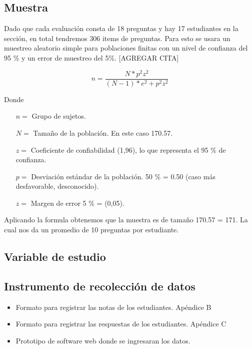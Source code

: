 \subsection{Muestra}

Dado que cada evaluación consta de 18 preguntas y hay 17 estudiantes en la sección, en total tendremos 306 items de preguntas. Para esto se usara un muestreo aleatorio simple para poblaciones finitas con un nivel de confianza del 95 \%  y un error de muestreo del 5\%. [AGREGAR CITA]

\[ n  = \frac{ N * p^{2} z^{2} } { (N - 1) * e^{2} + p^{2} z^{2} } \]

\vskip 0.1cm 
Donde
\vskip 0.1cm 

\begin{itemize}
	\item [$n =$] Grupo de sujetos.
	\item [$N =$] Tamaño de la población. En este caso 170.57.
	\item [$z =$] Coeficiente de confiabilidad (1,96), lo que representa el 95 \% de confianza.
	\item [$p =$] Desviación estándar de la población. 50 \% = 0.50 (caso más desfavorable, desconocido).
	\item [$z =$] Margen de error 5 \% = (0,05).
\end{itemize}

Aplicando la formula obtenemos que la muestra es de tamaño 170.57 = 171. La cual nos da un promedio de 10 preguntas por estudiante.


\subsection{Variable de estudio}




\subsection{Instrumento de recolección de datos}

\begin{itemize}
	\item Formato para registrar las notas de los estudiantes. Apéndice B
	\item Formato para registrar las respuestas de los estudiantes. Apéndice C
	\item Prototipo de software web donde se ingresaran los datos.
\end{itemize}

